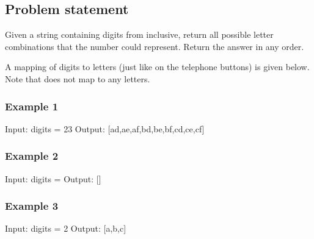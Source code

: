 \documentclass[letterpaper,12pt,english]{book}
\begin{document}
\subsection{Problem statement\sphinxfootnotemark[92]}
\label{\detokenize{Recursive/17_Letter_Combinations_of_a_Phone_Number:problem-statement}}%
\begin{footnotetext}[92]\sphinxAtStartFootnote
{}
%
\end{footnotetext}\ignorespaces 
\sphinxAtStartPar
Given a string containing digits from  inclusive, return all possible letter combinations that the number could represent. Return the answer in any order.

\sphinxAtStartPar
A mapping of digits to letters (just like on the telephone buttons) is given below. Note that  does not map to any letters.

\sphinxAtStartPar
{}


\subsubsection{Example 1}
\label{\detokenize{Recursive/17_Letter_Combinations_of_a_Phone_Number:example-1}}
\begin{sphinxVerbatim}[commandchars=\\\{\}]
Input: digits = \PYGZdq{}23\PYGZdq{}
Output: [\PYGZdq{}ad\PYGZdq{},\PYGZdq{}ae\PYGZdq{},\PYGZdq{}af\PYGZdq{},\PYGZdq{}bd\PYGZdq{},\PYGZdq{}be\PYGZdq{},\PYGZdq{}bf\PYGZdq{},\PYGZdq{}cd\PYGZdq{},\PYGZdq{}ce\PYGZdq{},\PYGZdq{}cf\PYGZdq{}]
\end{sphinxVerbatim}


\subsubsection{Example 2}
\label{\detokenize{Recursive/17_Letter_Combinations_of_a_Phone_Number:example-2}}
\begin{sphinxVerbatim}[commandchars=\\\{\}]
Input: digits = \PYGZdq{}\PYGZdq{}
Output: []
\end{sphinxVerbatim}


\subsubsection{Example 3}
\label{\detokenize{Recursive/17_Letter_Combinations_of_a_Phone_Number:example-3}}
\begin{sphinxVerbatim}[commandchars=\\\{\}]
Input: digits = \PYGZdq{}2\PYGZdq{}
Output: [\PYGZdq{}a\PYGZdq{},\PYGZdq{}b\PYGZdq{},\PYGZdq{}c\PYGZdq{}]
\end{sphinxVerbatim}
\end{document}
